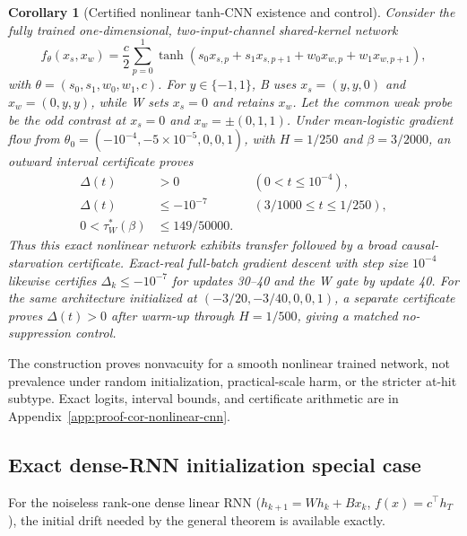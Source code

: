 \documentclass{article}
\newtheorem{corollary}{Corollary}
\theoremstyle{definition}
\theoremstyle{remark}
\begin{document}
\begin{corollary}[Certified nonlinear tanh-CNN existence and control]
\label{cor:nonlinear-cnn}
Consider the fully trained one-dimensional, two-input-channel shared-kernel network
\begin{equation}
 f_\theta(x_s,x_w)=\frac c2\sum_{p=0}^{1}\tanh\!\left(s_0x_{s,p}+s_1x_{s,p+1}+w_0x_{w,p}+w_1x_{w,p+1}\right),
 \label{eq:tanh-cnn}
\end{equation}
with $\theta=(s_0,s_1,w_0,w_1,c)$. For $y\in\{-1,1\}$, B uses $x_s=(y,y,0)$ and $x_w=(0,y,y)$, while W sets $x_s=0$ and retains $x_w$. Let the common weak probe be the odd contrast at $x_s=0$ and $x_w=\pm(0,1,1)$. Under mean-logistic gradient flow from $\theta_0=(-10^{-4},-5\times10^{-5},0,0,1)$, with $H=1/250$ and $\beta=3/2000$, an outward interval certificate proves
\begin{equation}
 \begin{aligned}
  \Delta(t)&>0 &&(0<t\le10^{-4}),\\
  \Delta(t)&\le-10^{-7} &&(3/1000\le t\le1/250),\\
  0<\tau_W^*(\beta)&\le149/50000.&&
 \end{aligned}
 \label{eq:tanh-cnn-certificate}
\end{equation}
Thus this exact nonlinear network exhibits transfer followed by a broad causal-starvation certificate. Exact-real full-batch gradient descent with step size $10^{-4}$ likewise certifies $\Delta_k\le-10^{-7}$ for updates 30--40 and the W gate by update 40. For the same architecture initialized at $(-3/20,-3/40,0,0,1)$, a separate certificate proves $\Delta(t)>0$ after warm-up through $H=1/500$, giving a matched no-suppression control.
\end{corollary}
The construction proves nonvacuity for a smooth nonlinear trained network, not prevalence under random initialization, practical-scale harm, or the stricter at-hit subtype. Exact logits, interval bounds, and certificate arithmetic are in Appendix~\ref{app:proof-cor-nonlinear-cnn}.

\subsection{Exact dense-RNN initialization special case}
For the noiseless rank-one dense linear RNN ($h_{k+1} = Wh_k + Bx_k$, $f(x) = c^\top h_T$), the initial drift needed by the general theorem is available exactly.
\end{document}
